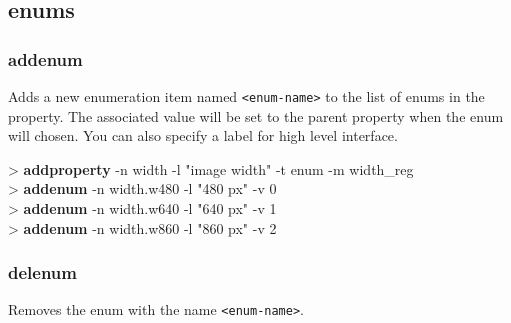 \documentclass[10pt,a4paper]{article}
\begin{document}
\subsection{enums}
\subsubsection{addenum}
\label{subsec:addenum}

Adds a new enumeration item named \texttt{<enum-name>} to the list of enums in the property. The associated value will be set to the parent property when the enum will chosen. You can also specify a label for high level interface.\\


\begin{sampletitle}
> \textbf{\tool{} addproperty} -n width -l "image width" -t enum -m width\_reg \\
> \textbf{\tool{} addenum} -n width.w480 -l "480 px" -v 0 \\
> \textbf{\tool{} addenum} -n width.w640 -l "640 px" -v 1 \\
> \textbf{\tool{} addenum} -n width.w860 -l "860 px" -v 2
\end{sampletitle}


\subsubsection{delenum}
\label{subsec:delenum}

Removes the enum with the name \texttt{<enum-name>}.\\

\end{document}
